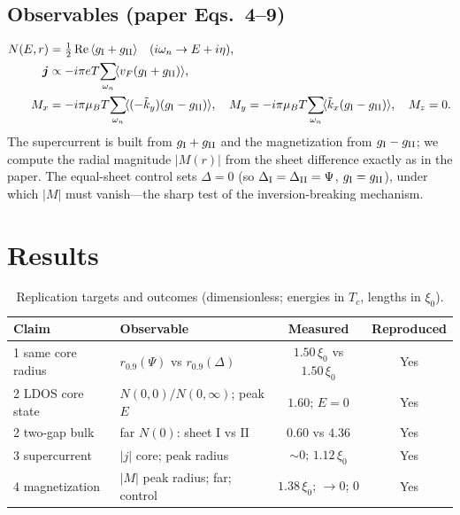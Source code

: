 \documentclass[11pt]{article}
\begin{document}
\subsection{Observables (paper Eqs.~4--9)}
\begin{align}
N(E,r) &= \tfrac12\,\mathrm{Re}\,\langle g_{\rm I}+g_{\rm II}\rangle
   \quad(i\omega_n\to E+i\eta),\\
\bm j &\propto -i\pi eT\!\sum_{\omega_n}\!\langle v_F(g_{\rm I}+g_{\rm II})\rangle,\\
M_x &= -i\pi\mu_B T\!\sum_{\omega_n}\!\langle(-\tilde k_y)(g_{\rm I}-g_{\rm II})\rangle,\quad
M_y = -i\pi\mu_B T\!\sum_{\omega_n}\!\langle \tilde k_x(g_{\rm I}-g_{\rm II})\rangle,\quad M_z=0 .
\end{align}
The supercurrent is built from $g_{\rm I}+g_{\rm II}$ and the magnetization
from $g_{\rm I}-g_{\rm II}$; we compute the radial magnitude $|M(r)|$ from the
sheet difference exactly as in the paper. The equal-sheet control sets
$\Delta=0$ (so $\Delta_{\rm I}=\Delta_{\rm II}=\Psi$, $g_{\rm I}=g_{\rm II}$),
under which $|M|$ must vanish---the sharp test of the inversion-breaking
mechanism.

\section{Results}
\begin{table}[h]\centering
\begin{tabular}{llcc}
\toprule
Claim & Observable & Measured & Reproduced\\
\midrule
1 same core radius & $r_{0.9}(\Psi)$ vs $r_{0.9}(\Delta)$ & $1.50\,\xi_0$ vs $1.50\,\xi_0$ & \textcolor{green!60!black}{Yes}\\
2 LDOS core state & $N(0,0)/N(0,\infty)$; peak $E$ & $1.60$; $E{=}0$ & \textcolor{green!60!black}{Yes}\\
2 two-gap bulk & far $N(0)$: sheet I vs II & $0.60$ vs $4.36$ & \textcolor{green!60!black}{Yes}\\
3 supercurrent & $|j|$ core; peak radius & $\sim0$; $1.12\,\xi_0$ & \textcolor{green!60!black}{Yes}\\
4 magnetization & $|M|$ peak radius; far; control & $1.38\,\xi_0$; $\to0$; $0$ & \textcolor{green!60!black}{Yes}\\
\bottomrule
\end{tabular}
\caption{Replication targets and outcomes (dimensionless; energies in $T_c$,
lengths in $\xi_0$).}
\label{tab:claims}
\end{table}
\end{document}
